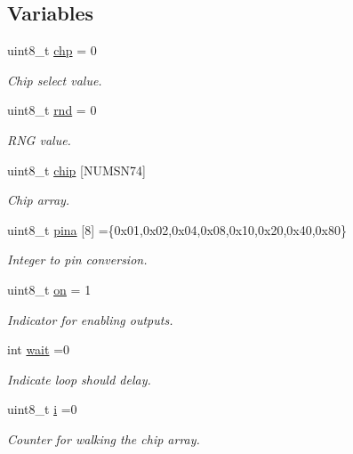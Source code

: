 \subsection*{Variables}
\begin{DoxyCompactItemize}
\item 
uint8\+\_\+t \hyperlink{SN74__RandomBlink_8ino_aab45faad5b835d77a869fca4747ab75d}{chp} = 0
\begin{DoxyCompactList}\small\item\em Chip select value. \end{DoxyCompactList}\item 
uint8\+\_\+t \hyperlink{SN74__RandomBlink_8ino_ad1a4ecf3125fbcc9447f70f7361f2fb0}{rnd} = 0
\begin{DoxyCompactList}\small\item\em R\+NG value. \end{DoxyCompactList}\item 
uint8\+\_\+t \hyperlink{SN74__RandomBlink_8ino_a4bc5cfe94d996891a734c6c645f44e45}{chip} \mbox{[}N\+U\+M\+S\+N74\mbox{]}
\begin{DoxyCompactList}\small\item\em Chip array. \end{DoxyCompactList}\item 
uint8\+\_\+t \hyperlink{SN74__RandomBlink_8ino_a74fac0365dddec359ec40da99dde9d8a}{pina} \mbox{[}8\mbox{]} =\{0x01,0x02,0x04,0x08,0x10,0x20,0x40,0x80\}
\begin{DoxyCompactList}\small\item\em Integer to pin conversion. \end{DoxyCompactList}\item 
uint8\+\_\+t \hyperlink{SN74__RandomBlink_8ino_a6dc166123fed68e9b34a2512623163e0}{on} = 1
\begin{DoxyCompactList}\small\item\em Indicator for enabling outputs. \end{DoxyCompactList}\item 
int \hyperlink{SN74__RandomBlink_8ino_aaefdb10b18059f3c08332338630b3f68}{wait} =0
\begin{DoxyCompactList}\small\item\em Indicate loop should delay. \end{DoxyCompactList}\item 
uint8\+\_\+t \hyperlink{SN74__RandomBlink_8ino_af27e3188294c2df66d975b74a09c001d}{i} =0
\begin{DoxyCompactList}\small\item\em Counter for walking the chip array. \end{DoxyCompactList}\end{DoxyCompactItemize}


